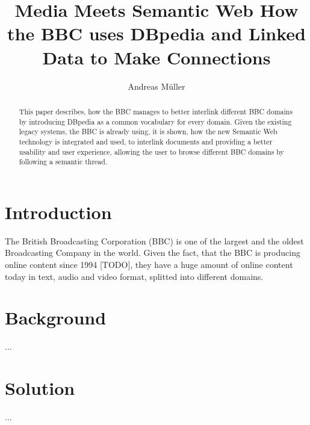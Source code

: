 \documentclass{llncs}
\begin{document}
%
\frontmatter          %
%
\pagestyle{headings}  %
%
\mainmatter              %
%
\title{Media Meets Semantic Web \newline How the BBC uses DBpedia and Linked Data \newline to Make Connections}
%
%
\author{Andreas M\"{u}ller}
%
%
%

\maketitle              %

\begin{abstract} %
This paper describes, how the BBC manages to better interlink different BBC domains by introducing DBpedia as a common vocabulary for every domain. Given the existing legacy systems, the BBC is already using, it is shown, how the new Semantic Web technology is integrated and used, to interlink documents and providing a better usability and user experience, allowing the user to browse different BBC domains by following a semantic thread.
\end{abstract}
%
\section{Introduction}
%
The British Broadcasting Corporation (BBC) is one of the largest and the oldest Broadcasting Company in the world. Given the fact, that the BBC is producing online content since 1994 [TODO], they have a huge amount of online content today in text, audio and video format, splitted into different domains.
%
\section{Background}
%
...
%
\section{Solution}
%
...
%
\end{document}

